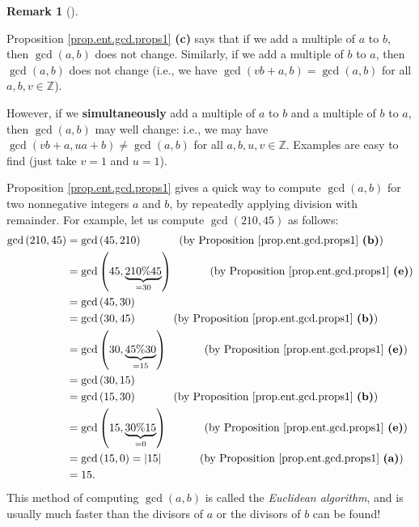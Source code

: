 \documentclass[numbers=enddot,12pt,final,onecolumn,notitlepage]{scrartcl}%
\numberwithin{exer}{subsection}
\theoremstyle{definition}
\newtheorem{remk}[theo]{Remark}
\newenvironment{remark}[1][]
{\begin{remk}[#1]\begin{leftbar}}
{\end{leftbar}\end{remk}}
\begin{document}
\begin{remark}
Proposition \ref{prop.ent.gcd.props1} \textbf{(c)} says that if we add a
multiple of $a$ to $b$, then $\gcd\left(  a,b\right)  $ does not change.
Similarly, if we add a multiple of $b$ to $a$, then $\gcd\left(  a,b\right)  $
does not change (i.e., we have $\gcd\left(  vb+a,b\right)  =\gcd\left(
a,b\right)  $ for all $a,b,v\in\mathbb{Z}$).

However, if we \textbf{simultaneously} add a multiple of $a$ to $b$ and a
multiple of $b$ to $a$, then $\gcd\left(  a,b\right)  $ may well change: i.e.,
we may have $\gcd\left(  vb+a,ua+b\right)  \neq\gcd\left(  a,b\right)  $ for
all $a,b,u,v\in\mathbb{Z}$. Examples are easy to find (just take $v=1$ and
$u=1$).
\end{remark}

Proposition \ref{prop.ent.gcd.props1} gives a quick way to compute
$\gcd\left(  a,b\right)  $ for two nonnegative integers $a$ and $b$, by
repeatedly applying division with remainder. For example, let us compute
$\gcd\left(  210,45\right)  $ as follows:%
\begin{align*}
\gcd\left(  210,45\right)   &  =\gcd\left(  45,210\right)
\ \ \ \ \ \ \ \ \ \ \left(  \text{by Proposition \ref{prop.ent.gcd.props1}
\textbf{(b)}}\right) \\
&  =\gcd\left(  45,\underbrace{210\%45}_{=30}\right)
\ \ \ \ \ \ \ \ \ \ \left(  \text{by Proposition \ref{prop.ent.gcd.props1}
\textbf{(e)}}\right) \\
&  =\gcd\left(  45,30\right) \\
&  =\gcd\left(  30,45\right)  \ \ \ \ \ \ \ \ \ \ \left(  \text{by Proposition
\ref{prop.ent.gcd.props1} \textbf{(b)}}\right) \\
&  =\gcd\left(  30,\underbrace{45\%30}_{=15}\right)
\ \ \ \ \ \ \ \ \ \ \left(  \text{by Proposition \ref{prop.ent.gcd.props1}
\textbf{(e)}}\right) \\
&  =\gcd\left(  30,15\right) \\
&  =\gcd\left(  15,30\right)  \ \ \ \ \ \ \ \ \ \ \left(  \text{by Proposition
\ref{prop.ent.gcd.props1} \textbf{(b)}}\right) \\
&  =\gcd\left(  15,\underbrace{30\%15}_{=0}\right)
\ \ \ \ \ \ \ \ \ \ \left(  \text{by Proposition \ref{prop.ent.gcd.props1}
\textbf{(e)}}\right) \\
&  =\gcd\left(  15,0\right)  =\left\vert 15\right\vert
\ \ \ \ \ \ \ \ \ \ \left(  \text{by Proposition \ref{prop.ent.gcd.props1}
\textbf{(a)}}\right) \\
&  =15.
\end{align*}
This method of computing $\gcd\left(  a,b\right)  $ is called the
\textit{Euclidean algorithm}, and is usually much faster than the divisors of
$a$ or the divisors of $b$ can be found!
\end{document}
